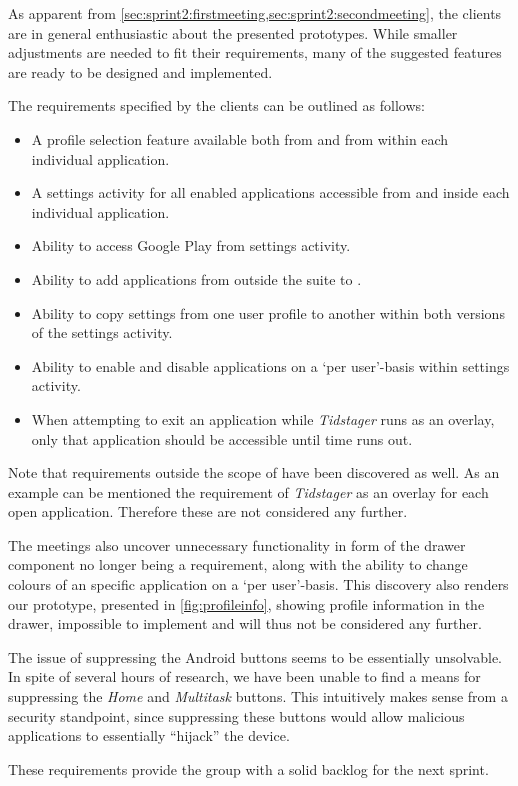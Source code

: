 As apparent from \cref{sec:sprint2:firstmeeting,sec:sprint2:secondmeeting}, the clients are in general enthusiastic about the presented prototypes.
While smaller adjustments are needed to fit their requirements, many of the suggested features are ready to be designed and implemented.

The requirements specified by the clients can be outlined as follows:

\begin{itemize}
\item A profile selection feature available both from \launcher and from within each individual application.
\item A settings activity for all enabled applications accessible from \launcher and inside each individual application.
\item Ability to access Google Play from \launcher settings activity.
\item Ability to add applications from outside the \giraf suite to \launcher.
\item Ability to copy settings from one user profile to another within both versions of the settings activity.
\item Ability to enable and disable applications on a `per user'-basis within \launcher settings activity.
\item When attempting to exit an application while \textit{Tidstager} runs as an overlay, only that application should be accessible until time runs out.
\end{itemize}

Note that requirements outside the scope of \launcher have been discovered as well.
As an example can be mentioned the requirement of \textit{Tidstager} as an overlay for each open application.
Therefore these are not considered any further.

The meetings also uncover unnecessary functionality in form of the drawer component no longer being a requirement, along with the ability to change colours of an specific application on a `per user'-basis.
This discovery also renders our prototype, presented in \cref{fig:profileinfo}, showing profile information in the drawer, impossible to implement and will thus not be considered any further.

The issue of suppressing the Android buttons seems to be essentially unsolvable. 
In spite of several hours of research, we have been unable to find a means for suppressing the \textit{Home} and \textit{Multitask} buttons. 
This intuitively makes sense from a security standpoint, since suppressing these buttons would allow malicious applications to essentially ``hijack'' the device.

These requirements provide the group with a solid backlog for the next sprint.